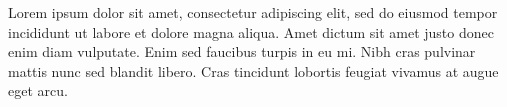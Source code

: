 Lorem ipsum dolor sit amet, consectetur adipiscing elit, sed do eiusmod tempor incididunt ut labore et dolore magna aliqua. Amet dictum sit amet justo donec enim diam vulputate. Enim sed faucibus turpis in eu mi. Nibh cras pulvinar mattis nunc sed blandit libero. Cras tincidunt lobortis feugiat vivamus at augue eget arcu.